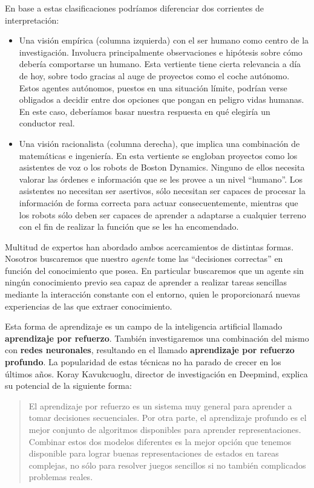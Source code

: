 En base a estas clasificaciones podríamos diferenciar dos corrientes de interpretación:
\begin{itemize}
    \item Una visión empírica (columna izquierda) con el ser humano como centro de la investigación. Involucra principalmente observaciones e hipótesis sobre cómo debería comportarse un humano. Esta vertiente tiene cierta relevancia a día de hoy, sobre todo gracias al auge de proyectos como el coche autónomo. Estos agentes autónomos, puestos en una situación límite, podrían verse obligados a decidir entre dos opciones que pongan en peligro vidas humanas. En este caso, deberíamos basar nuestra respuesta en qué elegiría un conductor real.
    \item Una visión racionalista (columna derecha), que implica una combinación de matemáticas e ingeniería. En esta vertiente se engloban proyectos como los asistentes de voz o los robots de Boston Dynamics. Ninguno de ellos necesita valorar las órdenes e información que se les provee a un nivel ``humano''. Los asistentes no necesitan ser asertivos, sólo necesitan ser capaces de procesar la información de forma correcta para actuar consecuentemente, mientras que los robots sólo deben ser capaces de aprender a adaptarse a cualquier terreno con el fin de realizar la función que se les ha encomendado.
\end{itemize}

Multitud de expertos han abordado ambos acercamientos de distintas formas. Nosotros buscaremos que nuestro \textit{agente} tome las ``decisiones correctas'' en función del conocimiento que posea. En particular buscaremos que un agente sin ningún conocimiento previo sea capaz de aprender a realizar tareas sencillas mediante la interacción constante con el entorno, quien le proporcionará nuevas experiencias de las que extraer conocimiento.

Esta forma de aprendizaje es un campo de la inteligencia artificial llamado \textbf{aprendizaje por refuerzo}. También investigaremos una combinación del mismo con \textbf{redes neuronales}, resultando en el llamado \textbf{aprendizaje por refuerzo profundo}. La popularidad de estas técnicas no ha parado de crecer en los últimos años. Koray Kavukcuoglu, director de investigación en Deepmind, explica su potencial de la siguiente forma:

\begin{quote}
    El aprendizaje por refuerzo es un sistema muy general para aprender a tomar decisiones secuenciales. Por otra parte, el aprendizaje profundo es el mejor conjunto de algoritmos disponibles para aprender representaciones. Combinar estos dos modelos diferentes es la mejor opción que tenemos disponible para lograr buenas representaciones de estados en tareas complejas, no sólo para resolver juegos sencillos si no también complicados problemas reales.
\end{quote}

